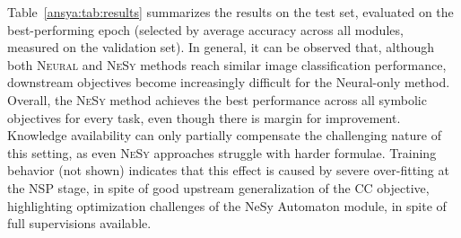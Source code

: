 Table~\ref{ansya:tab:results} summarizes the results on the test set, evaluated on the best-performing epoch (selected by average accuracy across all modules, measured on the validation set). In general, it can be observed that, although both \textsc{Neural} and \textsc{NeSy} methods reach similar image classification performance, downstream objectives become increasingly difficult for the Neural-only method. Overall, the \textsc{NeSy} method achieves the best performance across all symbolic objectives for every task, even though there is margin for improvement. Knowledge availability can only partially compensate the challenging nature of this setting, as even \textsc{NeSy} approaches struggle with harder formulae. Training behavior (not shown)  indicates that this effect is caused by severe over-fitting at the \textsc{NSP} stage, in spite of good upstream generalization of the \textsc{CC} objective, highlighting optimization challenges of the NeSy Automaton module, in spite of full supervisions available.









\fi
\iffalse

